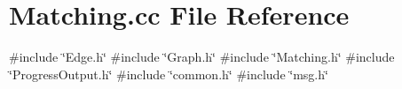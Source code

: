 \section{Matching.\+cc File Reference}
\label{Matching_8cc}
{\ttfamily \#include \char`\"{}Edge.\+h\char`\"{}}\newline
{\ttfamily \#include \char`\"{}Graph.\+h\char`\"{}}\newline
{\ttfamily \#include \char`\"{}Matching.\+h\char`\"{}}\newline
{\ttfamily \#include \char`\"{}Progress\+Output.\+h\char`\"{}}\newline
{\ttfamily \#include \char`\"{}common.\+h\char`\"{}}\newline
{\ttfamily \#include \char`\"{}msg.\+h\char`\"{}}\newline
